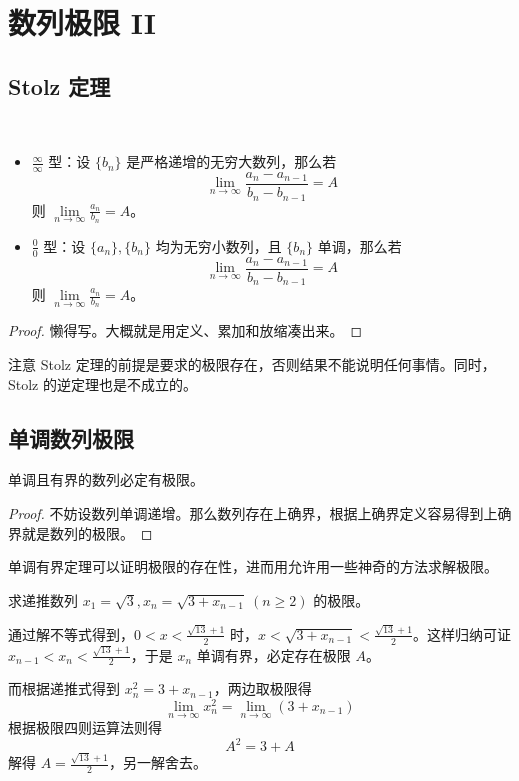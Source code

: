 \section{数列极限 II}

\subsection{Stolz 定理}

\begin{theorem}[Stolz 定理]
	\ 
	\begin{itemize}
		\item $\frac{\infty}{\infty}$ 型：设 $\{b_n\}$ 是严格递增的无穷大数列，那么若
		$$
		\lim_{n \to \infty} \frac{a_n - a_{n-1}}{b_n - b_{n-1}} = A
		$$
		则 $\lim\limits_{n \to \infty} \frac{a_n}{b_n} = A$。

		\item $\frac{0}{0}$ 型：设 $\{a_n\}, \{b_n\}$ 均为无穷小数列，且 $\{b_n\}$ 单调，那么若
		$$
		\lim_{n \to \infty} \frac{a_n - a_{n-1}}{b_n - b_{n-1}} = A
		$$
		则 $\lim\limits_{n \to \infty} \frac{a_n}{b_n} = A$。
	\end{itemize}

	\begin{proof}
		懒得写。大概就是用定义、累加和放缩凑出来。
	\end{proof}
\end{theorem}

注意 Stolz 定理的前提是要求的极限存在，否则结果不能说明任何事情。同时，Stolz 的逆定理也是不成立的。

\subsection{单调数列极限}

\begin{theorem}[单调有界定理]
	单调且有界的数列必定有极限。
	
	\begin{proof}
		不妨设数列单调递增。那么数列存在上确界，根据上确界定义容易得到上确界就是数列的极限。
	\end{proof}
\end{theorem}

单调有界定理可以证明极限的存在性，进而用允许用一些神奇的方法求解极限。

\begin{example}
	求递推数列 $x_1 = \sqrt{3}, x_n = \sqrt{3 + x_{n-1}}\ (n \ge 2)$ 的极限。

	\begin{solution}
		通过解不等式得到，$0 < x < \frac{\sqrt{13} + 1}{2}$ 时，$x < \sqrt{3 + x_{n-1}} < \frac{\sqrt{13} + 1}{2}$。这样归纳可证 $x_{n-1} < x_n < \frac{\sqrt{13} + 1}{2}$，于是 $x_n$ 单调有界，必定存在极限 $A$。

		而根据递推式得到 $x_n^2 = 3 + x_{n-1}$，两边取极限得
		$$
		\lim_{n \to \infty} x_n^2 = \lim_{n \to \infty} (3 + x_{n-1})
		$$
		根据极限四则运算法则得
		$$
		A^2 = 3 + A
		$$
		解得 $A = \frac{\sqrt{13} + 1}{2}$，另一解舍去。
	\end{solution}
\end{example}

